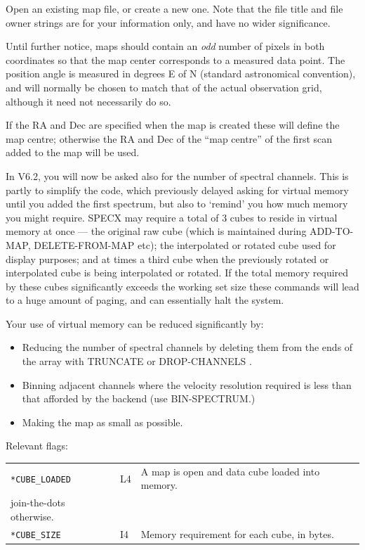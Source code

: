 \documentclass[11pt,twoside]{report}
\begin{document}
Open an existing map file, or create a new one. Note that the file title
and file owner strings are for your information only, and have no
wider significance.

Until further notice, maps should contain an {\em odd} number of pixels
in both coordinates so that the map center corresponds to a measured
data point. The position angle is measured in degrees E of N (\ie standard
astronomical convention), and will normally be chosen to match that of the
actual observation grid, although it need not necessarily do so.

If the RA and Dec are specified when the map is created these will define
the map centre; otherwise the RA and Dec of the ``map centre'' of the first
scan added to the map will be used.

In V6.2, you will now be asked also for the number of spectral channels.
This is partly to simplify the code, which previously delayed asking for
virtual memory until you added the first spectrum, but also to `remind'
you how much memory you might require. SPECX may require a total of 3
cubes to reside in virtual memory at once --- the original raw cube (which
is maintained during ADD-TO-MAP, DELETE-FROM-MAP etc); the interpolated 
or rotated cube used for display purposes; and at times a third cube when
the previously rotated or interpolated cube is being interpolated or rotated.
If the total memory required by these cubes significantly exceeds the 
working set size these commands will lead to a huge amount of paging, and
can essentially halt the system.

Your use of virtual memory can be reduced significantly by:
\begin{itemize}
\item Reducing the number of spectral channels by deleting them from the
ends of the array with TRUNCATE or DROP-CHANNELS
.
\item Binning adjacent channels where the velocity resolution required is
less than that afforded by the backend (use BIN-SPECTRUM.)
\item Making the map as small as possible.
\end{itemize}

Relevant flags:\\
\begin{tabular}{lll}
  \verb+*CUBE_LOADED+  & L4 & A map is open and data cube loaded into memory.\\
                            join-the-dots otherwise.\\
  \verb+*CUBE_SIZE+    & I4 & Memory requirement for each cube, in bytes.\\
\end{tabular}
\end{document}
